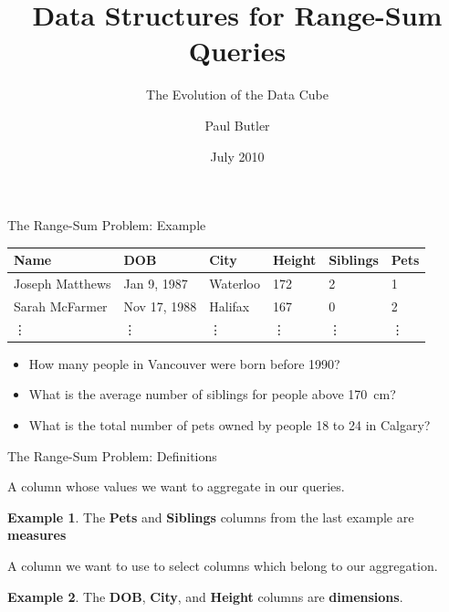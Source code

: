 \documentclass{beamer}
\title{Data Structures for Range-Sum Queries}
\subtitle{The Evolution of the Data Cube}
\author{Paul Butler}
\institute{
    CUMC 2010\\
    Waterloo, Ontario
}
\date{July 2010}
\theoremstyle{definition}
\newtheorem{myexample}{Example}
\theoremstyle{definition}
\begin{document}
\begin{frame}[plain]
    \titlepage
\end{frame}

\begin{frame}{The Range-Sum Problem: Example}
    \begin{table}[h]\footnotesize
        \begin{tabular}{ | l | l | l | l | l | l |}
        \hline
        \rowcolor{red!20!green!20!blue!20}
        \textbf{Name} & \textbf{DOB} & \textbf{City} & \textbf{Height} & \textbf{Siblings} & \textbf{Pets} \\ \hline
        Joseph Matthews & Jan 9, 1987 & Waterloo & 172 & 2 &  1 \\ \hline
        Sarah McFarmer & Nov 17, 1988 & Halifax & 167 & 0 & 2 \\ \hline
        \vdots & \vdots & \vdots & \vdots & \vdots & \vdots \\ \hline
        \end{tabular}
    \end{table}

    \begin{itemize}
        \item<+-> How many people in Vancouver were born before 1990?
        \item<+-> What is the average number of siblings for people above 170~cm?
        \item<+-> What is the total number of pets owned by people 18 to 24 in Calgary?
    \end{itemize}
\end{frame}

\begin{frame}{The Range-Sum Problem: Definitions}
    \begin{definition}[Measure]
        A column whose values we want to aggregate in our queries.
    \end{definition}
    \pause
    \begin{myexample}
        The \textbf{Pets} and \textbf{Siblings} columns from the last example are \textbf{measures}
    \end{myexample}
    \pause
    \begin{definition}[Dimension]
        A column we want to use to select columns which belong to our aggregation.
    \end{definition}
    \pause
    \begin{myexample}
        The \textbf{DOB}, \textbf{City}, and \textbf{Height} columns are \textbf{dimensions}.
    \end{myexample}
\end{frame}
\end{document}
